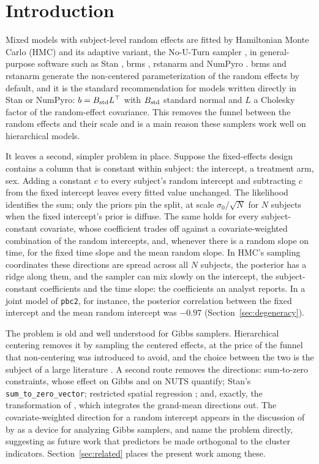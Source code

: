 \section{Introduction}\label{sec:intro}

Mixed models with subject-level random effects are fitted by Hamiltonian
Monte Carlo (HMC) and its adaptive variant, the No-U-Turn sampler
\citep[NUTS;][]{hoffman2014}, in general-purpose software such as Stan
\citep{carpenter2017}, brms \citep{burkner2017}, rstanarm and NumPyro
\citep{phan2019}. brms and rstanarm generate the non-centered
parameterization of the random effects by default, and it is the standard
recommendation for models written directly in Stan or NumPyro: $b =
B_{\mathrm{std}} L^{\top}$ with $B_{\mathrm{std}}$ standard normal and $L$ a Cholesky factor of
the random-effect covariance. This
removes the funnel between the random effects and their scale
\citep{neal2003,betancourt2015} and is a main reason these samplers work well on hierarchical models.

It leaves a second, simpler problem in place. Suppose the fixed-effects
design contains a column that is constant within subject: the intercept,
a treatment arm, sex. Adding a constant $c$ to every subject's random
intercept and subtracting $c$ from the fixed intercept leaves every fitted
value unchanged. The likelihood identifies the sum; only the priors pin the
split, at scale $\sigma_0/\sqrt{N}$ for $N$ subjects when the fixed
intercept's prior is diffuse. The same holds for every subject-constant covariate, whose
coefficient trades off against a covariate-weighted combination of the
random intercepts, and, whenever there is a random slope on time, for the
fixed time slope and the mean random slope. In HMC's sampling coordinates
these directions are spread across all $N$ subjects, the posterior has a
ridge along them, and the sampler can mix slowly on the intercept, the
subject-constant coefficients and the time slope: the coefficients an
analyst reports. In a joint model of \texttt{pbc2}, for instance, the
posterior correlation between the fixed intercept and the mean random
intercept was $-0.97$ (Section~\ref{sec:degeneracy}).

The problem is old and well understood for Gibbs samplers. Hierarchical
centering \citep{gelfand1995} removes it by sampling the centered effects,
at the price of the funnel that non-centering was introduced to avoid, and
the choice between the two is the subject of a large literature
\citep{papaspiliopoulos2003,papaspiliopoulos2007,yu2011}. A second route
removes the directions: sum-to-zero constraints, whose effect on Gibbs and
on NUTS \citet{zanella2021} quantify; Stan's \texttt{sum\_to\_zero\_vector};
restricted spatial regression \citep{reich2006,hodges2010}; and, exactly,
the transformation of \citet{vines1996}, which integrates the grand-mean
directions out. The covariate-weighted direction for a random intercept
appears in the discussion of \citet{zanella2021} by \citet{yang2021} as a
device for analyzing Gibbs samplers, and \citet{browne2009} name the
problem directly, suggesting as future work that predictors be made
orthogonal to the cluster indicators. Section~\ref{sec:related} places the
present work among these.

